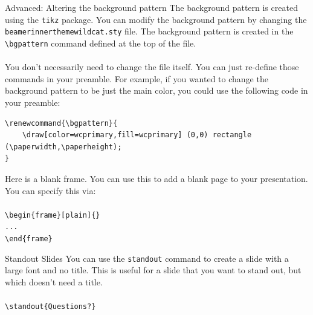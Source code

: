 \documentclass[aspectratio=1610]{beamer}
\begin{document}
\begin{frame}[fragile]{Advanced: Altering the background pattern}
    The background pattern is created using the \texttt{tikz} package. You can modify the background pattern by changing the \texttt{beamerinnerthemewildcat.sty} file. The background pattern is created in the \texttt{\textbackslash bgpattern} command defined at the top of the file.
    \\ ~ \\
    You don't necessarily need to change the file itself. You can just re-define those commands in your preamble. For example, if you wanted to change the background pattern to be just the main color, you could use the following code in your preamble: \\
    
    \scriptsize
    \begin{verbatim}
\renewcommand{\bgpattern}{
    \draw[color=wcprimary,fill=wcprimary] (0,0) rectangle (\paperwidth,\paperheight);
}
    \end{verbatim} 
\end{frame}




\begin{frame}[plain]{}
    Here is a blank frame. You can use this to add a blank page to your presentation. You can specify this via:
    \\ ~ \\
    \texttt{\textbackslash begin\{frame\}[plain]\{\}} \\
    \texttt{...} \\
    \texttt{\textbackslash end\{frame\}}
\end{frame}

\begin{frame}{Standout Slides}
    You can use the \texttt{standout} command to create a slide with a large font and no title. This is useful for a slide that you want to stand out, but which doesn't need a title.
    \\ ~ \\
    \texttt{\textbackslash standout\{Questions?\}}

\end{frame}

\end{document}
